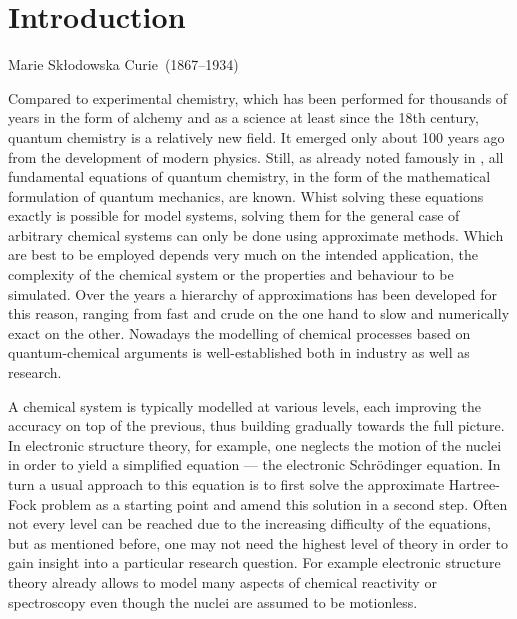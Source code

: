 \chapter{Introduction}
{Marie Skłodowska Curie~(1867--1934)}

\noindent
Compared to experimental chemistry, which has been
performed for thousands of years in the form of alchemy
and as a science at least since the 18th century,
quantum chemistry is a relatively new field.
It emerged only about 100 years ago from the development of modern physics.
Still, as \citet{Dirac1929} already noted famously in \citeyear{Dirac1929},
all fundamental equations of quantum chemistry,
in the form of the mathematical formulation of quantum mechanics,
are known.
Whist solving these equations exactly is possible for model systems,
solving them for the general case of arbitrary
chemical systems can only be done using approximate methods.
Which are best to be employed depends very much on
the intended application,
\ie the complexity of the chemical system
or the properties and behaviour to be simulated.
Over the years a hierarchy of approximations has been developed
for this reason,
ranging from fast and crude on the one hand to slow and numerically exact on the other.
Nowadays the modelling of chemical processes
based on quantum-chemical arguments
is well-established both in industry as well as research.

A chemical system is typically modelled at various levels,
each improving the accuracy on top of the previous,
thus building gradually towards the full picture.
In electronic structure theory, for example,
one neglects the motion of the nuclei
in order to yield a simplified equation --- the electronic Schrödinger equation.
In turn a usual approach to this equation is to first
solve the approximate Hartree-Fock problem
as a starting point and amend this solution in a second step.
Often not every level can be reached due to the increasing
difficulty of the equations,
but as mentioned before,
one may not need the highest level of theory in order to gain
insight into a particular research question.
For example electronic structure theory already allows to model
many aspects of chemical reactivity or spectroscopy
even though the nuclei are assumed to be motionless.

